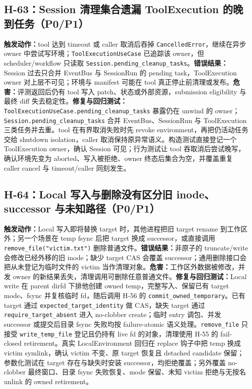 \documentclass[11pt,a4paper,fontset=fandol]{ctexart}
\newcommand{\code}[1]{\texttt{#1}}
\begin{document}
\subsection{H-63：Session 清理集合遗漏 ToolExecution 的晚到任务（P0/P1）}

\textbf{触发动作：}tool 达到 timeout 或 caller 取消后吞掉 \code{CancelledError}，继续在异步 owner 中尝试写环境；\code{ToolExecutionUseCase} 已追踪该 owner，但 scheduler/workflow 只读取 \code{Session.pending\_cleanup\_tasks}。\textbf{错误结果：}Session 过去只合并 EventBus 与 SessionRun 的 pending task，ToolExecution owner 对上层不可见；环境与 manifest 可能在 tool 真正停止前清理或发布。\textbf{危害：}评测返回后仍有 tool 写入 patch、状态或外部资源，submission eligibility 与最终 diff 失去稳定性。\textbf{修复与回归测试：}\code{ToolExecutionUseCase.pending\_cleanup\_tasks} 暴露仍在 unwind 的 owner；\code{Session.pending\_cleanup\_tasks} 合并 EventBus、SessionRun 与 ToolExecution 三类任务并去重。tool 在有界取消失败时先 revoke environment，再把仍活动任务交给 shutdown isolation，caller 取消保持原异常语义。构造测试直接登记一个 ToolExecution owner，确认 Session 可见；行为测试让 tool 吞取消后尝试晚写，确认环境先变为 aborted、写入被拒绝、owner 终态后集合为空，并覆盖重复 caller cancel 与 timeout/caller 同刻发生。

\subsection{H-64：Local 写入与删除没有区分旧 inode、successor 与未知路径（P0/P1）}

\textbf{触发动作：}Local 写入即将替换 target 时，其他进程把旧 target rename 到工作区外；另一个场景在 temp fsync 后把 target 换成 successor，或直接调用 \code{remove\_file("victim.txt")} 删除普通文件。\textbf{错误结果：}非原子的 truncate/write 会修改已经外移的旧 inode；缺少 target CAS 会覆盖 successor；通用删除接口会把从未登记为临时文件的 victim 当作清理对象。\textbf{危害：}工作区外数据被修改，并发 owner 的新结果丢失，清理调用可删除任意普通文件。\textbf{修复与回归测试：}Local write 在 parent dirfd 下排他创建 owned temp，完整写入、保留已有 target mode、fsync 并复核临时 fd，随后调用 H-56 的 \code{commit\_owned\_temporary}。已有 target 通过 \code{expected\_target\_identity} 做 CAS，缺失 target 通过 \code{require\_target\_absent} 进入 no-clobber create；临时 entry 调包、并发 successor 或提交后目录 fsync 失败均按 failure-atomic 语义处理。\code{remove\_file} 只接受 \code{write\_temp\_file} 登记且仍持有 live fd 的对象，清理使用 H-55 的 fail-closed retirement。真实 LocalEnvironment 回归在 replace 钩子中把 temp 换成 victim symlink，确认 victim 不变、原 target 恢复且 detached candidate 保留；参数化测试在 target 存在与缺失时安装 successor，均拒绝覆盖；另外覆盖 no-clobber 最终窗口、目录 fsync 失败恢复、mode 保留、未知 victim 拒绝与无按名 unlink 的 owned retirement。
\end{document}
